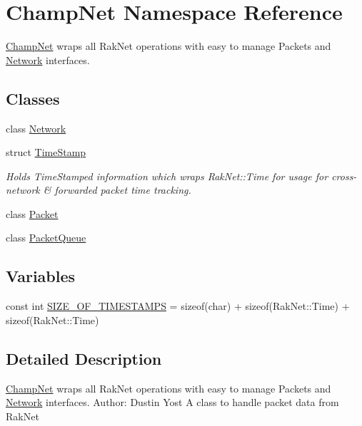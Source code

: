 \hypertarget{namespace_champ_net}{\section{Champ\-Net Namespace Reference}
\label{namespace_champ_net}
}


\hyperlink{namespace_champ_net}{Champ\-Net} wraps all Rak\-Net operations with easy to manage Packets and \hyperlink{class_champ_net_1_1_network}{Network} interfaces.  


\subsection*{Classes}
\begin{DoxyCompactItemize}
\item 
class \hyperlink{class_champ_net_1_1_network}{Network}
\item 
struct \hyperlink{struct_champ_net_1_1_time_stamp}{Time\-Stamp}
\begin{DoxyCompactList}\small\item\em Holds Time\-Stamped information which wraps Rak\-Net\-::\-Time for usage for cross-\/network \& forwarded packet time tracking. \end{DoxyCompactList}\item 
class \hyperlink{class_champ_net_1_1_packet}{Packet}
\item 
class \hyperlink{class_champ_net_1_1_packet_queue}{Packet\-Queue}
\end{DoxyCompactItemize}
\subsection*{Variables}
\begin{DoxyCompactItemize}
\item 
const int \hyperlink{namespace_champ_net_ae8bece8e869e20f234d9ae67256a735f}{S\-I\-Z\-E\-\_\-\-O\-F\-\_\-\-T\-I\-M\-E\-S\-T\-A\-M\-P\-S} = sizeof(char) + sizeof(Rak\-Net\-::\-Time) + sizeof(Rak\-Net\-::\-Time)
\end{DoxyCompactItemize}


\subsection{Detailed Description}
\hyperlink{namespace_champ_net}{Champ\-Net} wraps all Rak\-Net operations with easy to manage Packets and \hyperlink{class_champ_net_1_1_network}{Network} interfaces. Author\-: Dustin Yost A class to handle packet data from Rak\-Net 

